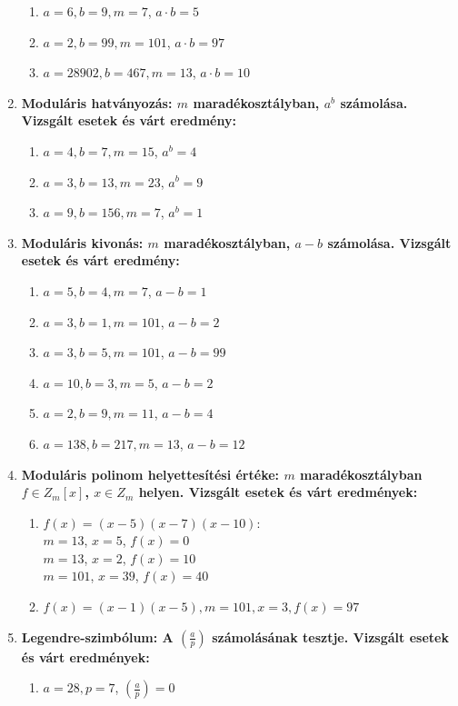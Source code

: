 \documentclass[12pt]{article}
\begin{document}
\begin{enumerate}
\begin{enumerate}
		\item $a=6, b = 9, m = 7$, $a \cdot b = 5$
		\item $a=2, b = 99, m=101$, $a \cdot b = 97$
		\item $a=28902, b=467, m=13$, $a \cdot b = 10$
	\end{enumerate}
	\item  \bfseries Moduláris hatványozás:
	\normalfont $m$ maradékosztályban, $a^b$ számolása. Vizsgált esetek és várt eredmény:
	\begin{enumerate}
		\item  $a = 4, b = 7, m = 15$, $a^b=4$
		\item  $a = 3, b = 13, m = 23$, $a^b=9$
		\item  $a = 9, b = 156, m = 7$, $a^b=1$
	\end{enumerate}
	\item \bfseries Moduláris kivonás:
	\normalfont $m$ maradékosztályban, $a-b$ számolása. Vizsgált esetek és várt eredmény:
	\begin{enumerate}
		\item  $a = 5, b = 4, m = 7$, $a-b=1$
		\item  $a = 3, b = 1, m = 101$, $a-b=2$
		\item  $a = 3, b = 5, m = 101$, $a-b=99$
		\item $a = 10, b = 3, m = 5$, $a-b=2$
		\item  $a = 2, b = 9, m = 11$, $a-b=4$
		\item $a=138, b=217, m=13$, $a-b=12$
	\end{enumerate}
	\item \bfseries Moduláris polinom helyettesítési értéke:
	\normalfont $m$ maradékosztályban $f \in Z_m[x]$, $x \in Z_m$ helyen. Vizsgált esetek és várt eredmények:
	\begin{enumerate}
		\item $f(x)=(x-5)(x-7)(x-10)$:
		\\ $m=13$, $x=5$, $f(x) = 0$ 
		\\ $m=13$, $x=2$, $f(x) = 10$
		\\ $m=101$, $x=39$, $f(x) = 40$
		\item $f(x)=(x-1)(x-5), m = 101, x = 3, f(x) = 97$
	\end{enumerate}
	\item \bfseries Legendre-szimbólum:
	\normalfont A $\left({\frac{a}{p}}\right)$ számolásának tesztje. Vizsgált esetek és várt eredmények:
	\begin{enumerate}
		\item $a = 28, p = 7$, $\left({\frac{a}{p}}\right) = 0$

\end{enumerate}
\end{enumerate}
\end{document}
